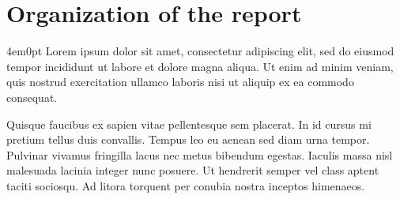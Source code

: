 \section{Organization of the report}
	\begin{indentedblock}{4em}{0pt}
		\fontsize{12pt}{\baselineskip}\selectfont
		Lorem ipsum dolor sit amet, consectetur adipiscing elit, sed do eiusmod tempor incididunt ut labore et dolore magna aliqua. Ut enim ad minim veniam, quis nostrud exercitation ullamco laboris nisi ut aliquip ex ea commodo consequat. 
		
		
		Quisque faucibus ex sapien vitae pellentesque sem placerat. In id cursus mi pretium tellus duis convallis. Tempus leo eu aenean sed diam urna tempor. Pulvinar vivamus fringilla lacus nec metus bibendum egestas. Iaculis massa nisl malesuada lacinia integer nunc posuere. Ut hendrerit semper vel class aptent taciti sociosqu. Ad litora torquent per conubia nostra inceptos himenaeos.
	\end{indentedblock}

\endgroup